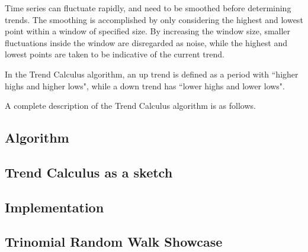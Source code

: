 \documentclass[../trend-calculus.tex]{subfiles}
\begin{document}
  Time series can fluctuate rapidly, and need to be smoothed before determining trends.
  The smoothing is accomplished by only considering the 
  highest and lowest point within a window of specified size.
  By increasing the window size, smaller fluctuations inside the window are disregarded as noise, 
  while the highest and lowest points are taken to be indicative of the current trend.

  In the Trend Calculus algorithm, an up trend is defined as a period with 
  ``higher highs and higher lows", while a down trend has ``lower highs and lower lows".

 A complete description of the Trend Calculus algorithm is as follows.

  \subsection{Algorithm}
    

  \subsection{Trend Calculus as a sketch}
    

  \subsection{Implementation}
    

  \subsection{Trinomial Random Walk Showcase}
    
\end{document}
